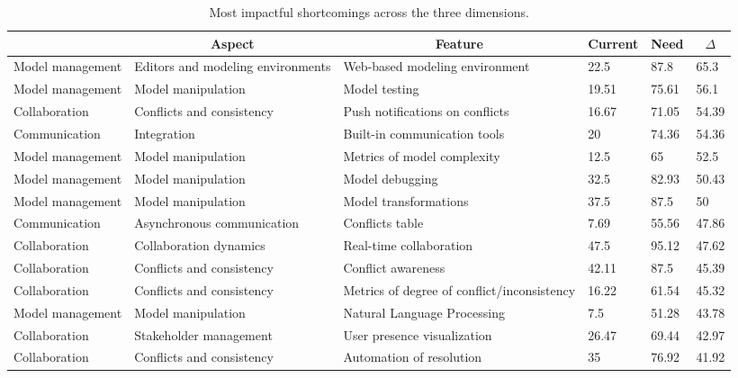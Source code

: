 
  \begin{table*}[]
  \centering
  \notsotiny
  \caption{ Most impactful shortcomings across the three dimensions.}
\label{tab:most-impactful}
\begin{tabular}{|l|l|l|l|l|l|}
  \hline
  \rowcolor[HTML]{C0C0C0}
    \multicolumn{1}{|c|}{Dimension} & \multicolumn{1}{c|}{Aspect} & \multicolumn{1}{c|}{Feature} & \multicolumn{1}{c|}{Current} & \multicolumn{1}{c|}{Need} & \multicolumn{1}{c|}{$\Delta$} \\ \hline
    Model management & Editors and modeling environments & Web-based modeling environment & 22.5 & 87.8 & 65.3 \\ \hline 
Model management & Model manipulation & Model testing & 19.51 & 75.61 & 56.1 \\ \hline 
Collaboration & Conflicts and consistency & Push notifications on conflicts & 16.67 & 71.05 & 54.39 \\ \hline 
Communication & Integration & Built-in communication tools & 20 & 74.36 & 54.36 \\ \hline 
Model management & Model manipulation & Metrics of model complexity & 12.5 & 65 & 52.5 \\ \hline 
Model management & Model manipulation & Model debugging & 32.5 & 82.93 & 50.43 \\ \hline 
Model management & Model manipulation & Model transformations & 37.5 & 87.5 & 50 \\ \hline 
Communication & Asynchronous communication & Conflicts table & 7.69 & 55.56 & 47.86 \\ \hline 
Collaboration & Collaboration dynamics & Real-time collaboration & 47.5 & 95.12 & 47.62 \\ \hline 
Collaboration & Conflicts and consistency & Conflict awareness & 42.11 & 87.5 & 45.39 \\ \hline 
Collaboration & Conflicts and consistency & Metrics of degree of conflict/inconsistency & 16.22 & 61.54 & 45.32 \\ \hline 
Model management & Model manipulation & Natural Language Processing & 7.5 & 51.28 & 43.78 \\ \hline 
Collaboration & Stakeholder management & User presence visualization & 26.47 & 69.44 & 42.97 \\ \hline 
Collaboration & Conflicts and consistency & Automation of resolution & 35 & 76.92 & 41.92 \\ \hline 

\end{tabular}
\end{table*}
